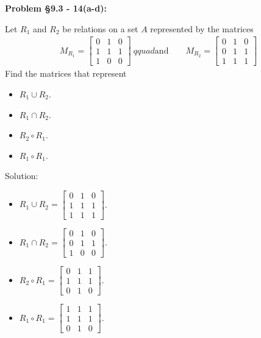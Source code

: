 \documentclass{article}
\newenvironment{problem}[1]
{\begin{mdframed}[default]
\textbf{Problem #1:}
}
{\end{mdframed}
}
\begin{document}
\begin{problem}{\S 9.3 - 14(a-d)}
Let $R_1$ and $R_2$ be relations on a set $A$ represented by the matrices
\begin{align*}
M_{R_1} = \begin{bmatrix} 0 & 1 & 0 \\ 1 & 1 & 1 \\ 1 & 0 & 0 \end{bmatrix} \
qquad \textrm{and} \qquad
M_{R_2} = \begin{bmatrix} 0 & 1 & 0 \\ 0 & 1 & 1 \\ 1 & 1 & 1 \end{bmatrix}
\end{align*}
Find the matrices that represent
\begin{itemize}
\item[(a)] $R_1 \cup R_2$.
\item[(b)] $R_1 \cap R_2$.
\item[(c)] $R_2 \circ R_1$.
\item[(d)] $R_1 \circ R_1$.
\end{itemize}

Solution:

\begin{itemize}
    \item[(a)] $R_1 \cup R_2=\begin{bmatrix}0&1&0 \\1&1&1 \\ 1&1&1 \end{bmatrix}$.
    \item[(b)] $R_1 \cap R_2=\begin{bmatrix}0&1&0 \\0&1&1 \\ 1&0&0 \end{bmatrix}$.
    \item[(c)] $R_2 \circ R_1=\begin{bmatrix}0&1&1 \\1&1&1 \\ 0&1&0 \end{bmatrix}$.
    \item[(d)] $R_1 \circ R_1=\begin{bmatrix}1&1&1 \\1&1&1 \\ 0&1&0 \end{bmatrix}$.
    \end{itemize}
\end{problem}
\end{document}
